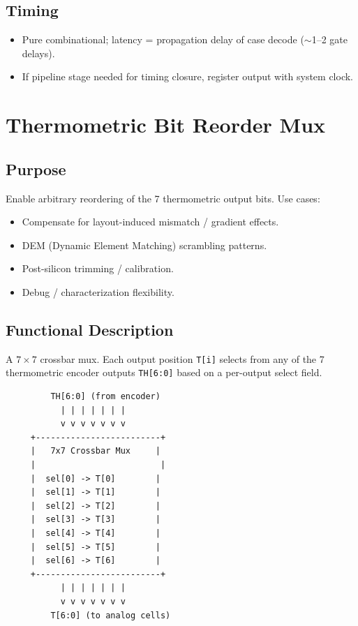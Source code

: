 \documentclass[11pt,a4paper]{article}
\begin{document}
\subsection{Timing}

\begin{itemize}
    \item Pure combinational; latency = propagation delay of case decode ($\sim$1--2 gate delays).
    \item If pipeline stage needed for timing closure, register output with system clock.
\end{itemize}

\section{Thermometric Bit Reorder Mux}

\subsection{Purpose}

Enable arbitrary reordering of the 7 thermometric output bits. Use cases:
\begin{itemize}
    \item Compensate for layout-induced mismatch / gradient effects.
    \item DEM (Dynamic Element Matching) scrambling patterns.
    \item Post-silicon trimming / calibration.
    \item Debug / characterization flexibility.
\end{itemize}

\subsection{Functional Description}

A $7\times7$ crossbar mux. Each output position \texttt{T[i]} selects from any of the 7 thermometric encoder outputs \texttt{TH[6:0]} based on a per-output select field.

\begin{verbatim}
         TH[6:0] (from encoder)
           | | | | | | |
           v v v v v v v
     +-------------------------+
     |   7x7 Crossbar Mux     |
     |                         |
     |  sel[0] -> T[0]        |
     |  sel[1] -> T[1]        |
     |  sel[2] -> T[2]        |
     |  sel[3] -> T[3]        |
     |  sel[4] -> T[4]        |
     |  sel[5] -> T[5]        |
     |  sel[6] -> T[6]        |
     +-------------------------+
           | | | | | | |
           v v v v v v v
         T[6:0] (to analog cells)
\end{verbatim}
\end{document}
